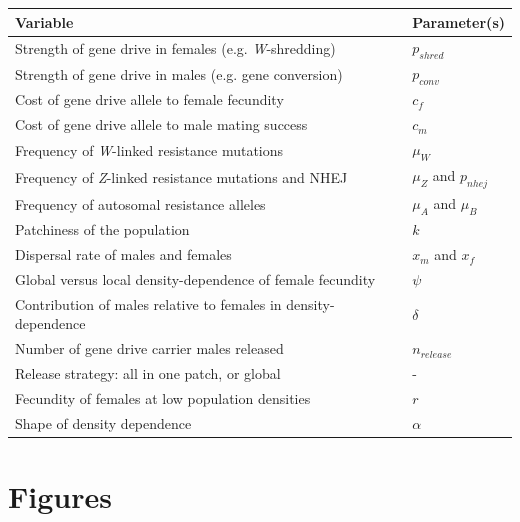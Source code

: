 \documentclass[]{rsos}%
\begin{document}
\begin{table}[ht]
\centering
\begin{tabular}{ll}
  \hline
Variable & Parameter(s) \\ 
  \hline
Strength of gene drive in females (e.g. \textit{W}-shredding) & $p_{shred}$ \\ 
  Strength of gene drive in males (e.g. gene conversion) & $p_{conv}$ \\ 
  Cost of gene drive allele to female fecundity & $c_f$ \\ 
  Cost of gene drive allele to male mating success & $c_m$ \\ 
  Frequency of \textit{W}-linked resistance mutations & $\mu_W$ \\ 
  Frequency of \textit{Z}-linked resistance mutations and NHEJ & $\mu_Z$ and $p_{nhej}$ \\ 
  Frequency of autosomal resistance alleles & $\mu_A$ and $\mu_B$ \\ 
  Patchiness of the population & $k$ \\ 
  Dispersal rate of males and females & $x_m$ and $x_f$ \\ 
  Global versus local density-dependence of female fecundity & $\psi$ \\ 
  Contribution of males relative to females in density-dependence & $\delta$ \\ 
  Number of gene drive carrier males released & $n_{release}$ \\ 
  Release strategy: all in one patch, or global & - \\ 
  Fecundity of females at low population densities & $r$ \\ 
  Shape of density dependence & $\alpha$ \\ 
   \hline
\end{tabular}
\end{table}

\newpage

\hypertarget{figures}{%
\section{Figures}\label{figures}}
\end{document}
